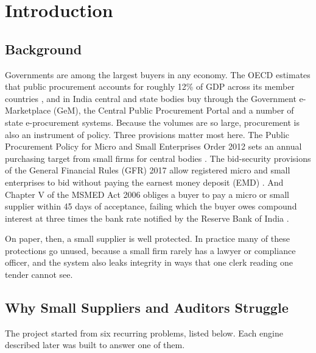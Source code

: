 \chapter{Introduction}
\label{ch:introduction}

\section{Background}
Governments are among the largest buyers in any economy. The OECD estimates that public procurement accounts for roughly 12\% of GDP across its member countries \cite{oecd2015recommendation}, and in India central and state bodies buy through the Government e-Marketplace (GeM), the Central Public Procurement Portal and a number of state e-procurement systems. Because the volumes are so large, procurement is also an instrument of policy. Three provisions matter most here. The Public Procurement Policy for Micro and Small Enterprises Order 2012 sets an annual purchasing target from small firms for central bodies \cite{mseorder2012}. The bid-security provisions of the General Financial Rules (GFR) 2017 allow registered micro and small enterprises to bid without paying the earnest money deposit (EMD) \cite{gfr2017}. And Chapter V of the MSMED Act 2006 obliges a buyer to pay a micro or small supplier within 45 days of acceptance, failing which the buyer owes compound interest at three times the bank rate notified by the Reserve Bank of India \cite{msmedact2006}.

On paper, then, a small supplier is well protected. In practice many of these protections go unused, because a small firm rarely has a lawyer or compliance officer, and the system also leaks integrity in ways that one clerk reading one tender cannot see.

\section{Why Small Suppliers and Auditors Struggle}
The project started from six recurring problems, listed below. Each engine described later was built to answer one of them.

